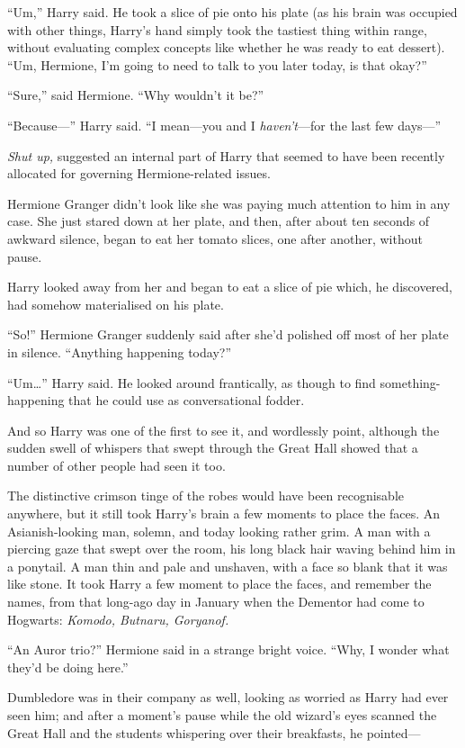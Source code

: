 ``Um,'' Harry said. He took a slice of pie onto his plate (as his brain
was occupied with other things, Harry's hand simply took the tastiest
thing within range, without evaluating complex concepts like whether he
was ready to eat dessert). ``Um, Hermione, I'm going to need to talk to
you later today, is that okay?''

``Sure,'' said Hermione. ``Why wouldn't it be?''

``Because---'' Harry said. ``I mean---you and I \emph{haven't}---for the
last few days---''

\emph{Shut up,} suggested an internal part of Harry that seemed to have
been recently allocated for governing Hermione-related issues.

Hermione Granger didn't look like she was paying much attention to him
in any case. She just stared down at her plate, and then, after about
ten seconds of awkward silence, began to eat her tomato slices, one
after another, without pause.

Harry looked away from her and began to eat a slice of pie which, he
discovered, had somehow materialised on his plate.

``So!'' Hermione Granger suddenly said after she'd polished off most of
her plate in silence. ``Anything happening today?''

``Um\ldots{}'' Harry said. He looked around frantically, as though to
find something-happening that he could use as conversational fodder.

And so Harry was one of the first to see it, and wordlessly point,
although the sudden swell of whispers that swept through the Great Hall
showed that a number of other people had seen it too.

The distinctive crimson tinge of the robes would have been recognisable
anywhere, but it still took Harry's brain a few moments to place the
faces. An Asianish-looking man, solemn, and today looking rather grim. A
man with a piercing gaze that swept over the room, his long black hair
waving behind him in a ponytail. A man thin and pale and unshaven, with
a face so blank that it was like stone. It took Harry a few moment to
place the faces, and remember the names, from that long-ago day in
January when the Dementor had come to Hogwarts: \emph{Komodo, Butnaru,
Goryanof.}

``An Auror trio?'' Hermione said in a strange bright voice. ``Why, I
wonder what they'd be doing here.''

Dumbledore was in their company as well, looking as worried as Harry had
ever seen him; and after a moment's pause while the old wizard's eyes
scanned the Great Hall and the students whispering over their
breakfasts, he pointed---

